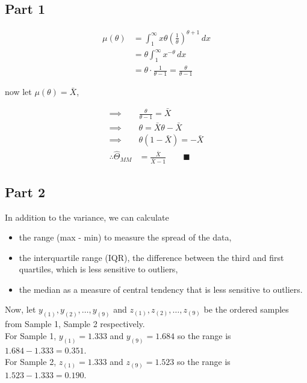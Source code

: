 \documentclass{article}
\begin{document}
\subsection*{Part 1}

$$
\begin{aligned}
\mu(\theta) &= \int_{1}^\infty x \theta \left( \frac{1}{\theta} \right)^{\theta + 1} \, dx \\
&= \theta \int _{1}^\infty x^{-\theta} \, dx \\
&= \theta \cdot \frac{1}{\theta - 1} = \frac{\theta}{\theta - 1}
\end{aligned}
$$

now let $\mu(\theta) = \bar{X}$,

$$
\begin{aligned}
\implies &\frac{\theta}{\theta - 1} = \bar{X} \\
\implies & \theta = \bar{X}\theta - \bar{X} \\
\implies &\theta(1-\bar{X}) = -\bar{X} \\
\therefore \hat{\Theta}_{MM} &= \frac{\bar{X}}{\bar{X} - 1} \qquad \blacksquare
\end{aligned}
$$

\newpage
\subsection*{Part 2}

In addition to the variance, we can calculate
\begin{itemize}
    \item the range (max - min) to measure the spread of the data,
    \item the interquartile range (IQR), the difference between the third and first quartiles, which is less sensitive to outliers,
    \item the median as a measure of central tendency that is less sensitive to outliers.
\end{itemize}

Now, let $y_{(1)}, y_{(2)}, \dots, y_{(9)}$ and $z_{(1)}, z_{(2)}, \dots, z_{(9)}$ be the ordered samples from Sample 1, Sample 2 respectively. \\

For Sample 1, $y_{(1)} = 1.333$ and $y_{(9)} = 1.684$ so the range is $1.684 - 1.333 = 0.351$.  \\ 

For Sample 2, $z_{(1)} = 1.333$ and $z_{(9)} = 1.523$ so the range is $1.523 - 1.333 = 0.190$.  \\
\end{document}
